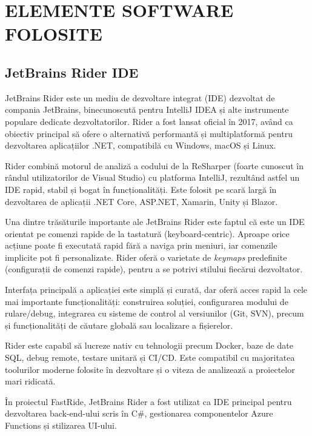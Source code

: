 \chapter {ELEMENTE SOFTWARE FOLOSITE}
\section{JetBrains Rider IDE}

JetBrains Rider este un mediu de dezvoltare integrat (IDE) dezvoltat de compania JetBrains, binecunoscută pentru IntelliJ IDEA și alte instrumente populare dedicate dezvoltatorilor. Rider a fost lansat oficial în 2017, având ca obiectiv principal să ofere o alternativă performantă și multiplatformă pentru dezvoltarea aplicațiilor .NET, compatibilă cu Windows, macOS și Linux. \parencite{rider}

Rider combină motorul de analiză a codului de la ReSharper (foarte cunoscut în rândul utilizatorilor de Visual Studio) cu platforma IntelliJ, rezultând astfel un IDE rapid, stabil și bogat în funcționalități. Este folosit pe scară largă în dezvoltarea de aplicații .NET Core, ASP.NET, Xamarin, Unity și Blazor. \parencite{rider}

Una dintre trăsăturile importante ale JetBrains Rider este faptul că este un IDE orientat pe comenzi rapide de la tastatură (keyboard-centric). Aproape orice acțiune poate fi executată rapid fără a naviga prin meniuri, iar comenzile implicite pot fi personalizate. Rider oferă o varietate de \textit{keymaps} predefinite (configurații de comenzi rapide), pentru a se potrivi stilului fiecărui dezvoltator. \parencite{rider}

Interfața principală a aplicației este simplă și curată, dar oferă acces rapid la cele mai importante funcționalități: construirea soluției, configurarea modului de rulare/debug, integrarea cu sisteme de control al versiunilor (Git, SVN), precum și funcționalități de căutare globală sau localizare a fișierelor. \parencite{rider}

Rider este capabil să lucreze nativ cu tehnologii precum Docker, baze de date SQL, debug remote, testare unitară și CI/CD. Este compatibil cu majoritatea toolurilor moderne folosite în dezvoltare și o viteza de analizează a proiectelor mari ridicată. \parencite{rider}

În proiectul FastRide, JetBrains Rider a fost utilizat ca IDE principal pentru dezvoltarea back-end-ului scris în C\#, gestionarea componentelor Azure Functions și stilizarea UI-ului.

